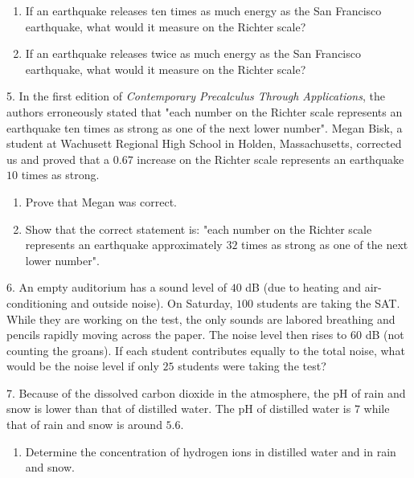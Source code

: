\documentclass[10pt,]{book}
\theoremstyle{plain}
\theoremstyle{definition}
\theoremstyle{definition}
\theoremstyle{definition}
\numberwithin{equation}{section}
\begin{document}
\begin{exerciselist}
\begin{enumerate}[label=(\alph*)]
\item\hypertarget{li-229}{}If an earthquake releases ten times as much energy as the San Francisco earthquake, what would it measure on the Richter scale?%
\item\hypertarget{li-230}{}If an earthquake releases twice as much energy as the San Francisco earthquake, what would it measure on the Richter scale?%
\end{enumerate}
%
\par\smallskip
\item[5.]\hypertarget{exercise-87}{}\hypertarget{p-317}{}%
In the first edition of \emph{Contemporary Precalculus Through Applications}, the authors erroneously stated that "each number on the Richter scale represents an earthquake ten times as strong as one of the next lower number".  Megan Bisk, a student at Wachusett Regional High School in Holden, Massachusetts, corrected us and proved that a \(0.67\) increase on the Richter scale represents an earthquake \(10\) times as strong. \leavevmode%
\begin{enumerate}[label=(\alph*)]
\item\hypertarget{li-231}{}Prove that Megan was correct.%
\item\hypertarget{li-232}{}Show that the correct statement is: "each number on the Richter scale represents an earthquake approximately \(32\) times as strong as one of the next lower number".%
\end{enumerate}
%
\par\smallskip
\item[6.]\hypertarget{exercise-88}{}\hypertarget{p-318}{}%
An empty auditorium has a sound level of \(40\) dB (due to heating and air-conditioning and outside noise).  On Saturday, \(100\) students are taking the SAT.  While they are working on the test, the only sounds are labored breathing and pencils rapidly moving across the paper.  The noise level then rises to \(60\) dB (not counting the groans).  If each student contributes equally to the total noise, what would be the noise level if only \(25\) students were taking the test?%
\par\smallskip
\item[7.]\hypertarget{exercise-89}{}\hypertarget{p-319}{}%
Because of the dissolved carbon dioxide in the atmosphere, the pH of rain and snow is lower than that of distilled water.   The pH of distilled water is \(7\) while that of rain and snow is around \(5.6\). \leavevmode%
\begin{enumerate}[label=(\alph*)]
\item\hypertarget{li-233}{}Determine the concentration of hydrogen ions in distilled water and in rain and snow.%

\end{enumerate}
\end{exerciselist}
\end{document}

